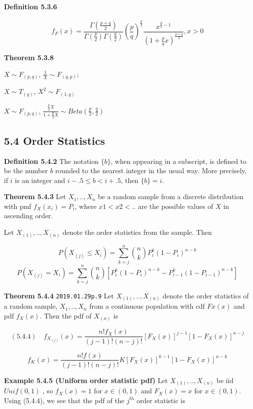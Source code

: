 \documentclass[6pt,twocolumn,Portrait]{article}
\let\oldparagraph\paragraph
\renewcommand{\paragraph}[1]{\oldparagraph{#1}\mbox{}}
\begin{document}
\hypertarget{F}{%
\paragraph{\texorpdfstring{\textbf{Definition
5.3.6}}{Definition 5.3.6}}\label{F}}

\[f_{F}(x)=\frac{\Gamma(\frac{p+q}2)}{\Gamma(\frac{p}2)\Gamma (\frac{q}2)}(\frac{p}q)^{\frac{p}2}\frac{x^{\frac{p}2-1}}{(1+\frac{p}qx)^{\frac{p+q}2}}, x>0\]

\textbf{Theorem 5.3.8}

\(X\sim F_(p,q)\), \(\frac{1}X \sim F_(q,p)\);

\(X\sim T_(q)\), \(X^2 \sim F_(1,q)\)

\(X\sim F_(p,q)\),
\(\frac{\frac{p}{q}X}{1+\frac{p}{q}X} \sim Beta(\frac{p}2,\frac{q}2)\)

\hypertarget{order}{%
\subsection{5.4 Order Statistics}\label{order}}

\textbf{Definition 5.4.2} The notation \(\{b\}\), when appearing in a
subscript, is defined to be the number \(b\) rounded to the nearest
integer in the usual way. More precisely, if \(i\) is an integer and
\(i-.5\le b<i+.5\), then \(\{b\}=i\).

\textbf{Theorem 5.4.3} Let \(X_1,..,X_n\) be a random sample from a
discrete distribution with pmf \(f_X(x_i)=P_i\), where \(x1<x2<..\) are
the possible values of \(X\) in ascending order.

Let \(X_{(1)},..,X_{(n)}\) denote the order statistics from the sample.
Then

\[P(X_{(j)}\le X_i)=\sum^n_{k=j}\binom{n}{k}P^k_i(1-P_i)^{n-k}\]
\[P(X_{(j)}=X_i)=\sum^n_{k=j}\binom{n}{k}[P^k_i(1-P_i)^{n-k}-P^k_{i-1}(1-P_{i-1})^{n-k}]\]

\textbf{Theorem 5.4.4}
\texttt{2019.01.29\textasciigrave{}\textasciigrave{}p.9} Let
\(X_{(1)},..,X_{(n)}\) denote the order statistics of a random sample,
\(X_1,..,X_n\) from a continuous population with cdf \(Fx (x)\) and pdf
\(f_X(x)\). Then the pdf of \(X_{(n)}\) is

\[(5.4.4)\quad f_{X_{(j)}}(x)=\frac{n!f_X(x)}{(j-1)!(n-j)!}[F_X(x)]^{j-1}[1-F_X(x)]^{n-j}\]

\[f_{K}(x)=\frac{n!f(x)}{(j-1)!(n-j)!}K[F_X(x)]^{k-1}[1-F_X(x)]^{n-k}\]

\textbf{Example 5.4.5 (Uniform order statistic pdf)} Let
\(X_{(1)},..,X_{(n)}\) be iid \(Unif(0,1)\) , so \(f_X(x)=1\) for
\(x\in(0,1)\) and \(F_X(x)=x\) for \(x\in(0,1)\). Using (5.4.4), we see
that the pdf of the \(j^{th}\) order statistic is
\end{document}
